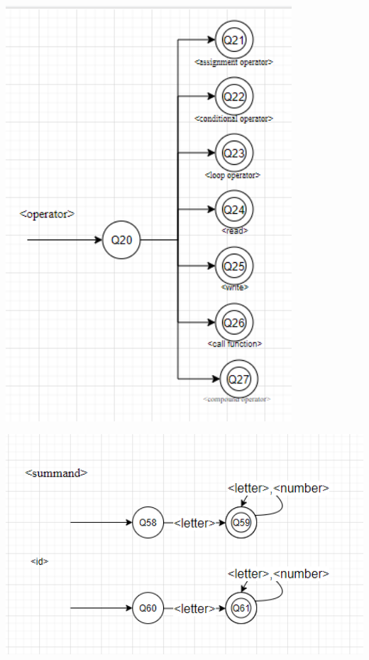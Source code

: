\documentclass[12pt]{article}
\begin{document}
\includegraphics[width=0.8\textwidth]{assets/Операторы.png}

\includegraphics[width=1\textwidth]{assets/Обозначения переменных.png}
\end{document}
